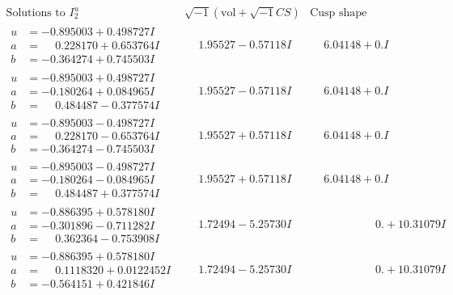 \documentclass[1p]{elsarticle_modified}
\theoremstyle{definition}
\newcommand{\I}{\sqrt{-1}}
\begin{document}
$$\begin{array}{c|c|c}  
\text{Solutions to }I^u_{2}& \I (\text{vol} + \sqrt{-1}CS) & \text{Cusp shape}\\
 \hline 
\begin{aligned}
u &= -0.895003 + 0.498727 I \\
a &= \phantom{-}0.228170 + 0.653764 I \\
b &= -0.364274 + 0.745503 I\end{aligned}
 & \phantom{-}1.95527 - 0.57118 I & \phantom{-}6.04148 + 0. I\phantom{ +0.000000I} \\ \hline\begin{aligned}
u &= -0.895003 + 0.498727 I \\
a &= -0.180264 + 0.084965 I \\
b &= \phantom{-}0.484487 - 0.377574 I\end{aligned}
 & \phantom{-}1.95527 - 0.57118 I & \phantom{-}6.04148 + 0. I\phantom{ +0.000000I} \\ \hline\begin{aligned}
u &= -0.895003 - 0.498727 I \\
a &= \phantom{-}0.228170 - 0.653764 I \\
b &= -0.364274 - 0.745503 I\end{aligned}
 & \phantom{-}1.95527 + 0.57118 I & \phantom{-}6.04148 + 0. I\phantom{ +0.000000I} \\ \hline\begin{aligned}
u &= -0.895003 - 0.498727 I \\
a &= -0.180264 - 0.084965 I \\
b &= \phantom{-}0.484487 + 0.377574 I\end{aligned}
 & \phantom{-}1.95527 + 0.57118 I & \phantom{-}6.04148 + 0. I\phantom{ +0.000000I} \\ \hline\begin{aligned}
u &= -0.886395 + 0.578180 I \\
a &= -0.301896 - 0.711282 I \\
b &= \phantom{-}0.362364 - 0.753908 I\end{aligned}
 & \phantom{-}1.72494 - 5.25730 I & \phantom{-0.000000 -}0. + 10.31079 I \\ \hline\begin{aligned}
u &= -0.886395 + 0.578180 I \\
a &= \phantom{-}0.1118320 + 0.0122452 I \\
b &= -0.564151 + 0.421846 I\end{aligned}
 & \phantom{-}1.72494 - 5.25730 I & \phantom{-0.000000 -}0. + 10.31079 I \\ \hline\begin{aligned}

\end{aligned}
\end{array}$$
\end{document}
